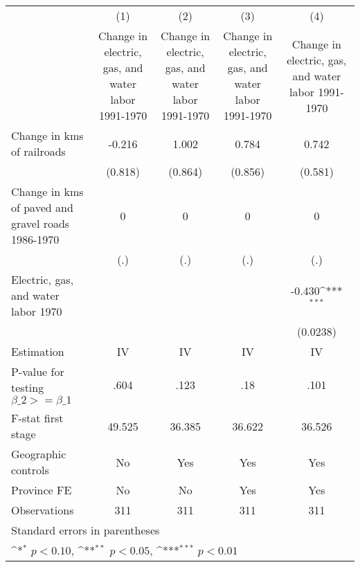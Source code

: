 {
\def\sym#1{\ifmmode^{#1}\else\(^{#1}\)\fi}
\begin{tabular}{l*{4}{c}}
\hline\hline
                &\multicolumn{1}{c}{(1)}&\multicolumn{1}{c}{(2)}&\multicolumn{1}{c}{(3)}&\multicolumn{1}{c}{(4)}\\
                &\multicolumn{1}{c}{Change in electric, gas, and water labor 1991-1970}&\multicolumn{1}{c}{Change in electric, gas, and water labor 1991-1970}&\multicolumn{1}{c}{Change in electric, gas, and water labor 1991-1970}&\multicolumn{1}{c}{Change in electric, gas, and water labor 1991-1970}\\
\hline
Change in kms of railroads&   -0.216         &    1.002         &    0.784         &    0.742         \\
                &  (0.818)         &  (0.864)         &  (0.856)         &  (0.581)         \\
[1em]
Change in kms of paved and gravel roads 1986-1970&        0         &        0         &        0         &        0         \\
                &      (.)         &      (.)         &      (.)         &      (.)         \\
[1em]
Electric, gas, and water labor 1970&                  &                  &                  &   -0.430\sym{***}\\
                &                  &                  &                  & (0.0238)         \\
\hline
Estimation      &       IV         &       IV         &       IV         &       IV         \\
P-value for testing $\beta\_2 >= \beta\_1$&     .604         &     .123         &      .18         &     .101         \\
F-stat first stage&   49.525         &   36.385         &   36.622         &   36.526         \\
Geographic controls&       No         &      Yes         &      Yes         &      Yes         \\
Province FE     &       No         &       No         &      Yes         &      Yes         \\
Observations    &      311         &      311         &      311         &      311         \\
\hline\hline
\multicolumn{5}{l}{\footnotesize Standard errors in parentheses}\\
\multicolumn{5}{l}{\footnotesize \sym{*} \(p<0.10\), \sym{**} \(p<0.05\), \sym{***} \(p<0.01\)}\\
\end{tabular}
}
